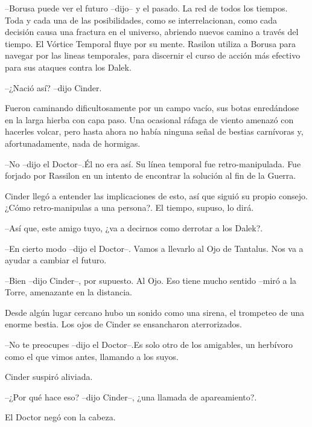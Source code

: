 --Borusa puede ver el futuro --dijo-- y el pasado. La red de todos los tiempos. Toda y cada una de las posibilidades, como se interrelacionan, como cada decisión causa una fractura en el universo, abriendo nuevos camino a través del tiempo. El Vórtice Temporal fluye por su mente. Rasilon utiliza a Borusa para navegar por las lineas temporales, para discernir el curso de acción más efectivo para sus ataques contra los Dalek.

--¿Nació así? --dijo Cinder.



Fueron caminando dificultosamente por un campo vacío, sus botas enredándose en la larga hierba con capa paso. Una ocasional ráfaga de viento amenazó con hacerles volcar, pero hasta ahora no había ninguna señal de bestias carnívoras y, afortunadamente, nada de hormigas.



--No --dijo el Doctor--.Él no era así. Su línea temporal fue retro-manipulada. Fue forjado por Rassilon en un intento de encontrar la solución al fin de la Guerra.



Cinder llegó a entender las implicaciones de esto, así que siguió su propio consejo. ¿Cómo retro-manipulas a una persona?. El tiempo, supuso, lo dirá. 



--Así que, este amigo tuyo, ¿va a decirnos como derrotar a los Dalek?.

--En cierto modo --dijo el Doctor--. Vamos a llevarlo al Ojo de Tantalus. Nos va a ayudar a cambiar el futuro.

--Bien --dijo Cinder--, por supuesto. Al Ojo. Eso tiene mucho sentido --miró a la Torre, amenazante en la distancia.



Desde algún lugar cercano hubo un sonido como una sirena, el trompeteo de una enorme bestia. Los ojos de Cinder se ensancharon aterrorizados.



--No te preocupes --dijo el Doctor--.Es solo otro de los amigables, un herbívoro como el que vimos antes, llamando a los suyos.



Cinder suspiró aliviada. 



--¿Por qué hace eso? --dijo Cinder--, ¿una llamada de apareamiento?.



El Doctor negó con la cabeza. 



